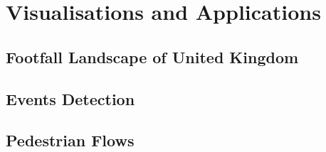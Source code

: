 \chapter{Visualisations and Applications} \label{chapter:application}

\section{Footfall Landscape of United Kingdom}

\section{Events Detection}

\section{Pedestrian Flows}
